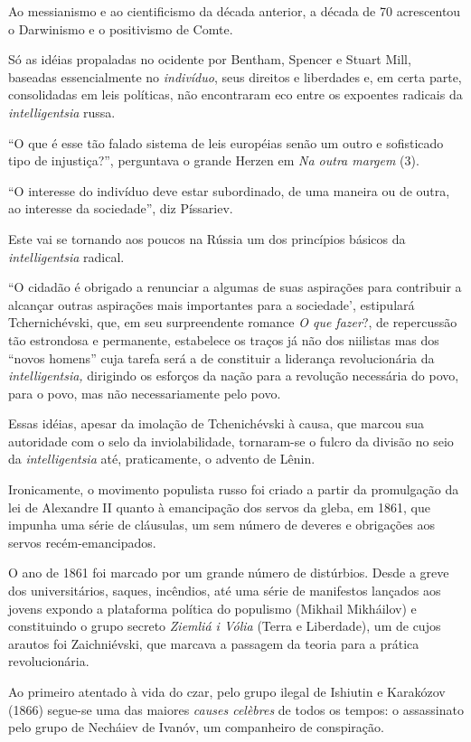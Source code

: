 Ao messianismo e ao cientificismo da década anterior, a década de 70
acrescentou o Darwinismo e o positivismo de Comte.

Só as idéias propaladas no ocidente por Bentham, Spencer e Stuart Mill,
baseadas essencialmente no \emph{indivíduo}, seus direitos e liberdades
e, em certa parte, consolidadas em leis políticas, não encontraram eco
entre os expoentes radicais da \emph{intelligentsia} russa.

``O que é esse tão falado sistema de leis européias senão um outro e
sofisticado tipo de injustiça?'', perguntava o grande Herzen em \emph{Na
outra margem} (3).

``O interesse do indivíduo deve estar subordinado, de uma maneira ou de
outra, ao interesse da sociedade'', diz Píssariev.

Este vai se tornando aos poucos na Rússia um dos princípios básicos da
\emph{intelligentsia} radical.

``O cidadão é obrigado a renunciar a algumas de suas aspirações para
contribuir a alcançar outras aspirações mais importantes para a
sociedade', estipulará Tchernichévski, que, em seu surpreendente romance
\emph{O que fazer}?, de repercussão tão estrondosa e permanente,
estabelece os traços já não dos niilistas mas dos ``novos homens'' cuja
tarefa será a de constituir a liderança revolucionária da
\emph{intelligentsia,} dirigindo os esforços da nação para a revolução
necessária do povo, para o povo, mas não necessariamente pelo povo.

Essas idéias, apesar da imolação de Tchenichévski à causa, que marcou
sua autoridade com o selo da inviolabilidade, tornaram-se o fulcro da
divisão no seio da \emph{intelligentsia} até, praticamente, o advento de
Lênin.

Ironicamente, o movimento populista russo foi criado a partir da
promulgação da lei de Alexandre II quanto à emancipação dos servos da
gleba, em 1861, que impunha uma série de cláusulas, um sem número de
deveres e obrigações aos servos recém-emancipados.

O ano de 1861 foi marcado por um grande número de distúrbios. Desde a
greve dos universitários, saques, incêndios, até uma série de manifestos
lançados aos jovens expondo a plataforma política do populismo (Mikhail
Mikháilov) e constituindo o grupo secreto \emph{Ziemliá i Vólia} (Terra
e Liberdade), um de cujos arautos foi Zaichniévski, que marcava a
passagem da teoria para a prática revolucionária.

Ao primeiro atentado à vida do czar, pelo grupo ilegal de Ishiutin e
Karakózov (1866) segue-se uma das maiores \emph{causes celèbres} de
todos os tempos: o assassinato pelo grupo de Necháiev de Ivanóv, um
companheiro de conspiração.

